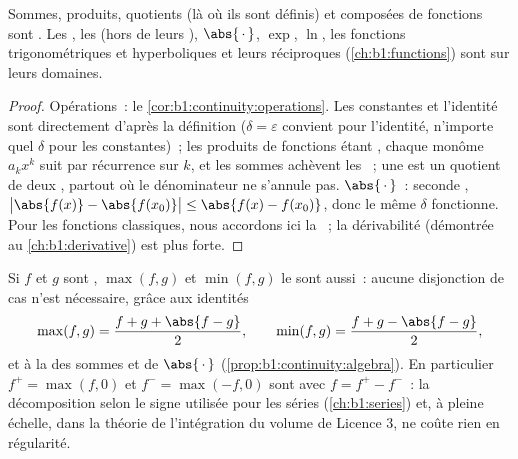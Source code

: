 \begin{proposition}\label{prop:b1:continuity:algebra}
Sommes, produits, quotients (là où ils sont définis) et composées de
fonctions  sont . Les , les  (hors de leurs ), $\abs{\,\cdot\,}$, $\exp$, $\ln$,
les fonctions trigonométriques et hyperboliques et leurs réciproques
(\cref{ch:b1:functions}) sont  sur leurs domaines.
\end{proposition}

\begin{proof}
Opérations~: le \cref{cor:b1:continuity:operations}. Les constantes
et l'identité sont  directement d'après la définition
($\delta = \varepsilon$ convient pour l'identité, n'importe quel
$\delta$ pour les constantes)~; les produits de fonctions
 étant , chaque monôme $a_k x^k$ suit par
récurrence sur $k$, et les sommes achèvent les ~; une
 est un quotient de deux , 
partout où le dénominateur ne s'annule pas.
$\abs{\,\cdot\,}$~: seconde ,
$\bigl|\abs{f(x)} - \abs{f(x_0)}\bigr| \leq \abs{f(x) -
f(x_0)}$, donc le même $\delta$ fonctionne. Pour les fonctions
classiques, nous accordons ici la ~; la dérivabilité
(démontrée au \cref{ch:b1:derivative}) est plus forte.
\end{proof}

\begin{example}\label{ex:b1:continuity:maxmin}
Si $f$ et $g$ sont , $\max(f, g)$ et $\min(f, g)$ le
sont aussi~: aucune disjonction de cas n'est nécessaire, grâce
aux identités
\[
\max(f, g) = \frac{f + g + \abs{f - g}}{2},
\qquad
\min(f, g) = \frac{f + g - \abs{f - g}}{2},
\]
et à la  des sommes et de $\abs{\,\cdot\,}$
(\cref{prop:b1:continuity:algebra}). En particulier $f^+ =
\max(f, 0)$ et $f^- = \max(-f, 0)$ sont  avec $f =
f^+ - f^-$~: la décomposition selon le signe utilisée pour les
séries (\cref{ch:b1:series}) et, à pleine échelle, dans la
théorie de l'intégration du volume de Licence 3, ne coûte rien
en régularité.
\end{example}

